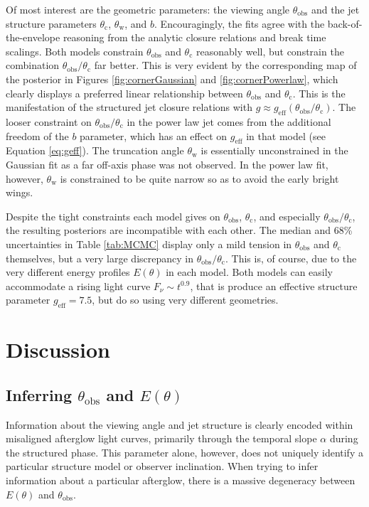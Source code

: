 \documentclass[twocolumn]{aastex62}
\newcommand{\thobs}{\ensuremath{\theta_{\mathrm{obs}}}}
\newcommand{\thW}{\ensuremath{\theta_{\mathrm{w}}}}
\newcommand{\thC}{\ensuremath{\theta_{\mathrm{c}}}}
\newcommand{\geff}{\ensuremath{g_{\mathrm{eff}}}}
\begin{document}
Of most interest are the geometric parameters: the viewing angle $\thobs$ and the jet structure parameters $\thC$, $\thW$, and $b$.  Encouragingly, the fits agree with the back-of-the-envelope reasoning from the analytic closure relations and break time scalings.  Both models constrain $\thobs$ and $\thC$ reasonably well, but constrain the combination $\thobs/\thC$ far better.  This is very evident by the corresponding map of the posterior in Figures \ref{fig:cornerGaussian} and \ref{fig:cornerPowerlaw}, which clearly displays a preferred linear relationship between $\thobs$ and $\thC$.  This is the manifestation of the structured jet closure relations with $g \approx \geff(\thobs/\thC)$.  The looser constraint on $\thobs/\thC$ in the power law jet comes from the additional freedom of the $b$ parameter, which has an effect on $\geff$ in that model (see Equation \eqref{eq:geff}). The truncation angle $\thW$ is essentially unconstrained in the Gaussian fit as a far off-axis phase was not observed.  In the power law fit, however, $\thW$ is constrained to be quite narrow so as to avoid the early bright wings.

Despite the tight constraints each model gives on $\thobs$, $\thC$, and especially $\thobs/\thC$, the resulting posteriors are incompatible with each other.  The median and 68\% uncertainties in Table \ref{tab:MCMC} display only a mild tension in $\thobs$  and $\thC$ themselves, but a very large discrepancy in $\thobs/\thC$.  This is, of course, due to the very different energy profiles $E(\theta)$ in each model.  Both models can easily accommodate a rising light curve $F_\nu \sim t^{0.9}$, that is produce an effective structure parameter $\geff = 7.5$, but do so using very different geometries.  


\section{Discussion}

\subsection{Inferring $\thobs$ and $E(\theta)$}

Information about the viewing angle and jet structure is clearly encoded within misaligned afterglow light curves, primarily through the temporal slope $\alpha$ during the structured phase.   This parameter alone, however, does not uniquely identify a particular structure model or observer inclination.  When trying to infer information about a particular afterglow, there is a massive degeneracy between $E(\theta)$ and $\thobs$.  
\end{document}
